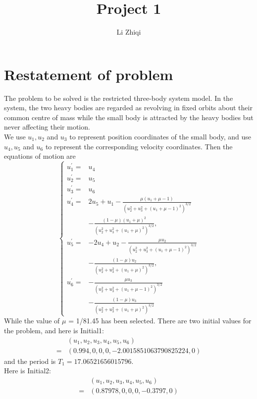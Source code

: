 \documentclass[a4paper,twocolumn]{article}
\title{Project 1}
\author{Li Zhiqi\quad3180103041}
\theoremstyle{definition}
\begin{document}
\maketitle
\section{Restatement of problem}
The problem to be solved is the restricted three-body system model. In the system, the two heavy bodies are regarded as revolving in fixed orbits about their common centre of mass while the small body is attracted by the heavy bodies but never affecting their motion.\\  We use $u_1,u_2$ and $u_3$ to represent position coordinates of the small body, and use $u_4,u_5$ and $u_6$ to represent the corresponding velocity coordinates. Then the equations of motion are
$$
\left\{\begin{aligned}
u_{1}^{\prime}=& u_{4} \\
u_{2}^{\prime}=& u_{5} \\
u_{3}^{\prime}=& u_{6} \\
u_{4}^{\prime}=& 2 u_{5}+u_{1}-\frac{\mu\left(u_{1}+\mu-1\right)}{\left(u_{2}^{2}+u_{3}^{2}+\left(u_{1}+\mu-1\right)^{2}\right)^{3 / 2}} \\
&-\frac{(1-\mu)\left(u_{1}+\mu\right)^{2}}{\left(u_{2}^{2}+u_{3}^{2}+\left(u_{1}+\mu\right)^{2}\right)^{3 / 2}}, \\
u_{5}^{\prime}=&-2 u_{4}+u_{2}-\frac{\mu u_{2}}{\left(u_{2}^{2}+u_{3}^{2}+\left(u_{1}+\mu-1\right)^{2}\right)^{3 / 2}} \\
&-\frac{(1-\mu) u_{2}}{\left(u_{2}^{2}+u_{3}^{2}+\left(u_{1}+\mu\right)^{2}\right)^{3 / 2}}, \\
u_{6}^{\prime}=&-\frac{\mu u_{3}}{\left(u_{2}^{2}+u_{3}^{2}+\left(u_{1}+\mu-1\right)^{2}\right)^{3 / 2}} \\
&-\frac{(1-\mu) u_{3}}{\left(u_{2}^{2}+u_{3}^{2}+\left(u_{1}+\mu\right)^{2}\right)^{3 / 2}}
\end{aligned}\right.
$$
While the value of $\mu$ = 1/81.45 has been selected. There are two initial values for the problem, and here is Initial1:
$$
\begin{aligned} &\left(u_{1}, u_{2}, u_{3}, u_{4}, u_{5}, u_{6}\right) \\=&(0.994,0,0,0,-2.0015851063790825224,0)
\end{aligned}
$$
and the period is $T_{1}=17.06521656015796 .$\\
Here is Initial2:
$$
\begin{aligned} &\left(u_{1}, u_{2}, u_{3}, u_{4}, u_{5}, u_{6}\right) \\=&(0.87978,0,0,0,-0.3797,0) 
\end{aligned}
$$
\end{document}
